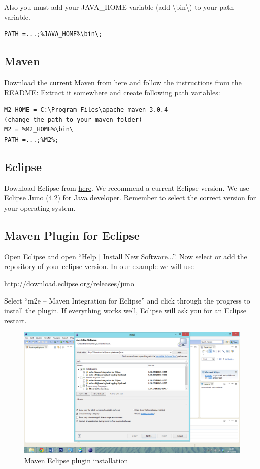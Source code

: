 Also you must add your JAVA\_HOME variable (add \textbackslash bin\textbackslash ) to your path variable.
\begin{verbatim}
PATH =...;%JAVA_HOME%\bin\;
\end{verbatim}



\subsection{Maven}
Download the current Maven from \href{http://maven.apache.org/download.html}{here} and follow the instructions from the README: Extract it somewhere and create following path variables:
\begin{verbatim}
M2_HOME = C:\Program Files\apache-maven-3.0.4 
(change the path to your maven folder)
M2 = %M2_HOME%\bin\
PATH =...;%M2%;
\end{verbatim}



\subsection{Eclipse}
Download Eclipse from \href{http://www.eclipse.org/juno/}{here}.
We recommend a current Eclipse version. We use Eclipse Juno (4.2) for Java developer.
Remember to select the correct version for your operating system. 



\subsection{Maven Plugin for Eclipse}
Open Eclipse and open "`Help | Install New Software..."'. Now select or add the repository of your eclipse version. In our example we will use 

\url{http://download.eclipse.org/releases/juno}
 
Select "`m2e – Maven Integration for Eclipse"' and click through the progress to install the plugin. If everything works well, Eclipse will ask you for an Eclipse restart. 

\begin{figure}
	\centering
		\includegraphics[width=\textwidth]{m2eplugin}
	\caption{Maven Eclipse plugin installation}
	\label{fig:m2eplugin}
\end{figure}




